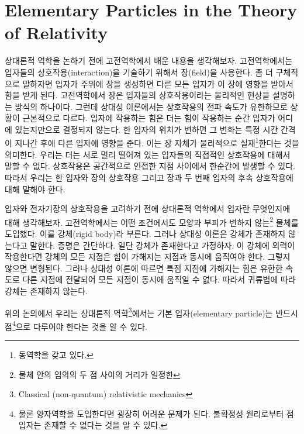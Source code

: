 \section{Elementary Particles in the Theory of Relativity}
\label{sec:05a-01a}

상대론적 역학을 논하기 전에 고전역학에서 배운 내용을 생각해보자. 고전역학에서는 입자들의 상호작용(interaction)을 기술하기 위해서 장(field)을 사용한다. 좀 더 구체적으로 말하자면 입자가 주위에 장을 생성하면 다른 모든 입자가 이 장에 영향을 받아서 힘을 받게 된다. 고전역학에서 장은 입자들의 상호작용이라는 물리적인 현상을 설명하는 방식의 하나이다.
그런데 상대성 이론에서는 상호작용의 전파 속도가 유한하므로 상황이 근본적으로 다르다. 입자에 작용하는 힘은 더는 힘이 작용하는 순간 입자가 어디에 있는지만으로 결정되지 않는다. 한 입자의 위치가 변하면 그 변화는 특정 시간 간격이 지나간 후에 다른 입자에 영향을 준다. 이는 장 자체가 물리적으로 실재\footnote{동역학을 갖고 있다.}한다는 것을 의미한다. 우리는 더는 서로 멀리 떨어져 있는 입자들의 직접적인 상호작용에 대해서 말할 수 없다. 상호작용은 공간적으로 인접한 지점 사이에서 한순간에 발생할 수 있다. 따라서 우리는 한 입자와 장의 상호작용 그리고 장과 두 번째 입자의 후속 상호작용에 대해 말해야 한다.

입자와 전자기장의 상호작용을 고려하기 전에 상대론적 역학에서 입자란 무엇인지에 대해 생각해보자.
고전역학에서는 어떤 조건에서도 모양과 부피가 변하지 않는\footnote{물체 안의 임의의 두 점 사이의 거리가 일정한} 물체를 도입했다. 이를 강체(rigid body)라 부른다. 그러나 상대성 이론은 강체가 존재하지 않는다고 말한다. 증명은 간단하다. 일단 강체가 존재한다고 가정하자. 이 강체에 외력이 작용한다면 강체의 모든 지점은 힘이 가해지는 지점과 동시에 움직여야 한다. 그렇지 않으면 변형된다. 그러나 상대성 이론에 따르면 특점 지점에 가해지는 힘은 유한한 속도로 다른 지점에 전달되어 모든 지점이 동시에 움직일 수 없다. 따라서 귀류법에 따라 강체는 존재하지 않는다.

위의 논의에서 우리는 상대론적 역학\footnote{Classical (non-quantum) relativistic mechanics}에서는 기본 입자(elementary particle)는 반드시 점\footnote{물론 양자역학을 도입한다면 굉장히 어려운 문제가 된다. 불확정성 원리로부터 점 입자는 존재할 수 없다는 것을 알 수 있다.}으로 다루어야 한다는 것을 알 수 있다.
